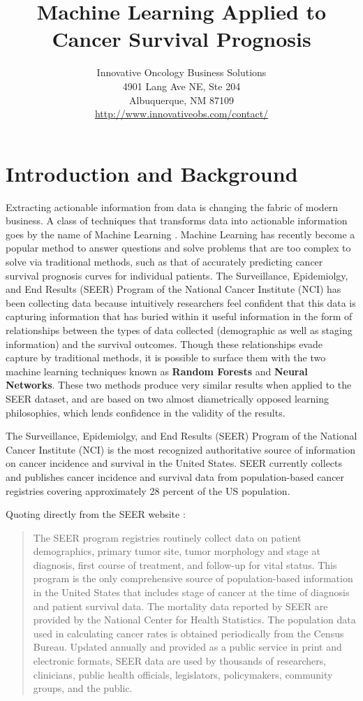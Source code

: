 \documentclass[a4paper,11pt]{article}
\title{Machine Learning Applied to Cancer Survival Prognosis}
\author{Innovative Oncology Business Solutions \\
 4901 Lang Ave NE, Ste 204 \\
Albuquerque, NM 87109 \\
\url{http://www.innovativeobs.com/contact/}}
\date{}
\begin{document}
\maketitle
\flushbottom


\section{Introduction and Background}
\label{sec:intro}



Extracting actionable information from data is changing the fabric of modern business. A class of techniques that transforms data into actionable information goes by the name of Machine Learning \cite{pythonmachinelearning}.
Machine Learning has recently become a popular method to answer questions and solve problems that are too complex to solve via traditional methods, such as that of accurately predicting cancer survival prognosis curves for individual patients.
The Surveillance, Epidemiolgy, and End Results (SEER) Program of the National Cancer Institute (NCI) has been collecting data because intuitively researchers feel confident that this data is capturing information that has buried within it useful information in the form of  relationships between the types of data collected (demographic as well as staging information) and the survival outcomes.
Though these relationships evade capture by traditional methods, it is possible to surface them with the two machine learning techniques known as \textbf{Random Forests} and \textbf{Neural Networks}. These two methods produce very similar results when applied to the SEER dataset, and are based on two almost diametrically opposed learning philosophies, which lends confidence in the validity of the results.

The Surveillance, Epidemiolgy, and End Results (SEER) Program of the National Cancer Institute (NCI) is the most recognized authoritative source of information on cancer incidence and survival in the United States. SEER currently collects and publishes cancer incidence and survival data from population-based cancer registries covering approximately 28 percent of the US population.


Quoting directly from the SEER
website \citep{seerwebsite}:

\begin{quote}
The SEER program registries routinely collect data on patient demographics, primary tumor site, tumor morphology and stage at diagnosis, first course of treatment, and follow-up for vital status. This program is the only comprehensive source of population-based information in the United States that includes stage of cancer at the time of diagnosis and patient survival data. The mortality data reported by SEER are provided by the National Center for Health Statistics. The population data used in calculating cancer rates is obtained periodically from the Census Bureau. Updated annually and provided as a public service in print and electronic formats, SEER data are used by thousands of researchers, clinicians, public health officials, legislators, policymakers, community groups, and the public.
\end{quote}
\end{document}
